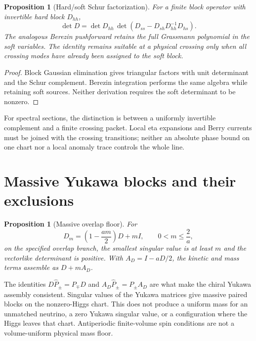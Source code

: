 \documentclass[11pt,a4paper,oneside]{book}
\theoremstyle{plain}
\newtheorem{proposition}[theorem]{Proposition}
\theoremstyle{definition}
\theoremstyle{remark}
\newcommand{\src}[2]{\cite{#1}}
\begin{document}
\begin{proposition}[Hard/soft Schur factorization]
\label{prop:hard-soft}
For a finite block operator with invertible hard block $D_{hh}$,
\begin{equation}
 \det D=\det D_{hh}\,
 \det\!\left(D_{ss}-D_{sh}D_{hh}^{-1}D_{hs}\right).
 \label{eq:hard-soft}
\end{equation}
The analogous Berezin pushforward retains the full Grassmann polynomial in the soft variables. The identity remains suitable at a physical crossing only when all crossing modes have already been assigned to the soft block.
\end{proposition}
\begin{proof}
Block Gaussian elimination gives triangular factors with unit determinant and the Schur complement. Berezin integration performs the same algebra while retaining soft sources. Neither derivation requires the soft determinant to be nonzero.
\end{proof}
\src{R4}{thm:v4v73-Berezin-Schur}

For spectral sections, the distinction is between a uniformly invertible complement and a finite crossing packet. Local eta expansions and Berry currents must be joined with the crossing transitions; neither an absolute phase bound on one chart nor a local anomaly trace controls the whole line.

\section{Massive Yukawa blocks and their exclusions}
\begin{proposition}[Massive overlap floor]
\label{prop:massive-overlap}
For
\begin{equation}
 D_m=\left(1-\frac{am}{2}\right)D+mI,
 \qquad0<m\le\frac2a,
 \label{eq:massive-overlap}
\end{equation}
on the specified overlap branch, the smallest singular value is at least $m$ and the vectorlike determinant is positive. With $A_D=I-aD/2$, the kinetic and mass terms assemble as $D+mA_D$.
\end{proposition}
\cite{R6}
The identities $D\widehat P_\pm=P_\mp D$ and $A_D\widehat P_\pm=P_\pm A_D$ are what make the chiral Yukawa assembly consistent. Singular values of the Yukawa matrices give massive paired blocks on the nonzero-Higgs chart. This does not produce a uniform mass for an unmatched neutrino, a zero Yukawa singular value, or a configuration where the Higgs leaves that chart. Antiperiodic finite-volume spin conditions are not a volume-uniform physical mass floor.
\end{document}
